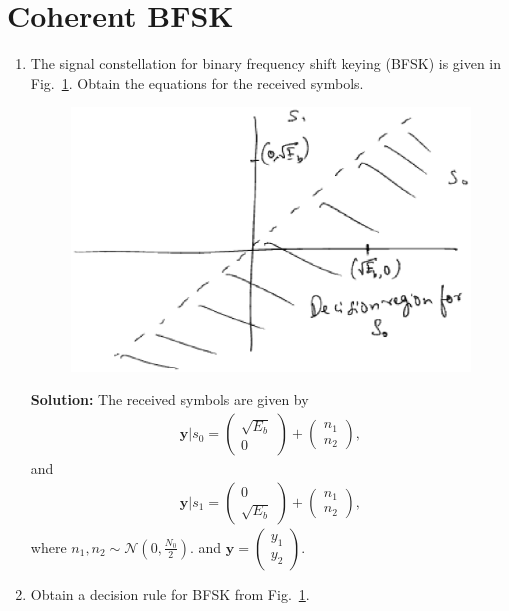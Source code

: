 \documentclass[journal,10pt,twocolumn]{IEEEtran}
\newcommand\figref{Fig.~\ref}
\newcommand{\solution}{\noindent \textbf{Solution: }}
\newcommand{\myvec}[1]{\ensuremath{\begin{pmatrix}#1\end{pmatrix}}}
\providecommand{\gauss}[2]{\mathcal{N}\ensuremath{\left(#1,#2\right)}}
\begin{document}
\section{Coherent BFSK}
\begin{enumerate}
\item
The signal constellation for binary frequency shift keying (BFSK) is given in \figref{fig:bfsk_const}.
Obtain the equations for the received symbols.

\begin{figure}[H]
\centering
\includegraphics[width=\columnwidth]{./figs/chapter6/bfsk_const.eps}
\caption{}
\label{fig:bfsk_const}
\end{figure}
\solution
The received symbols are given by
\begin{align}
\mathbf{y}|s_0 = 
\myvec{
\sqrt{E_b} \\
0
}
+
\myvec{
 n_{1}\\
n_{2}
},
\end{align}
and 
\begin{align}
\mathbf{y}|s_1 = 
\myvec{
0\\
\sqrt{E_b} 
}
+
\myvec{
n_{1}\\
 n_{2}
},
\end{align}
where $n_1,n_2 \sim \gauss{0}{\frac{N_0}{2}}$. and
$
\mathbf{y} = 
\myvec{
y_{1}\\
 y_{2}
}
$.
\item
Obtain a decision rule for BFSK from \figref{fig:bfsk_const}.


\end{enumerate}
\end{document}
